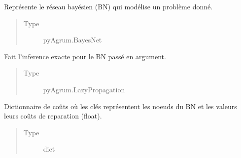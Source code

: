 \documentclass[letterpaper,10pt,french]{sphinxmanual}
\begin{document}
\begin{fulllineitems}
\begin{quote}
\begin{description}
\begin{itemize}
\end{itemize}

\end{description}\end{quote}

\begin{fulllineitems}
\label{\detokenize{index:DecisionTheoreticTroubleshooting.TroubleShootingProblem.bayesian_network}}
Représente le réseau bayésien (BN) qui modélise un problème donné.
\begin{quote}\begin{description}
\item[{Type}] \leavevmode
pyAgrum.BayesNet

\end{description}\end{quote}

\end{fulllineitems}


\begin{fulllineitems}
\label{\detokenize{index:DecisionTheoreticTroubleshooting.TroubleShootingProblem.bay_lp}}
Fait l’inference exacte pour le BN passé en argument.
\begin{quote}\begin{description}
\item[{Type}] \leavevmode
pyAgrum.LazyPropagation

\end{description}\end{quote}

\end{fulllineitems}


\begin{fulllineitems}
\label{\detokenize{index:DecisionTheoreticTroubleshooting.TroubleShootingProblem.costs_rep}}
Dictionnaire de coûts où les clés représentent les noeuds
du BN et les valeurs leurs coûts de reparation (float).
\begin{quote}\begin{description}
\item[{Type}] \leavevmode
dict


\end{description}
\end{quote}
\end{fulllineitems}
\end{fulllineitems}
\end{document}
